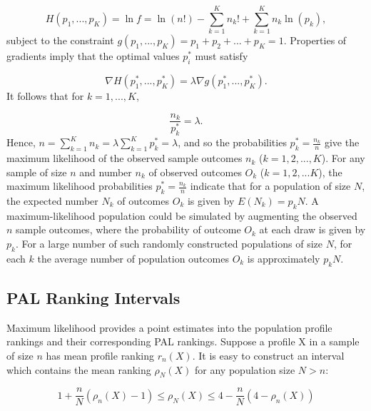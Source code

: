 \documentclass[a4paper, 12pt]{article}
\begin{document}
\begin{equation}
H(p_1, ..., p_K)=\ln f = \ln(n!) - \sum_{k=1}^{K} n_k! +\sum_{k=1}^{K} n_k\ln(p_k),
\end{equation}
\label{eq:5}
{\flushleft subject} to the constraint $g(p_1, ..., p_{K})=p_1+p_2+...+p_K=1$.  Properties of gradients imply that the optimal values $p_i^*$ must satisfy

\begin{equation}
\nabla H(p_1^*, ..., p_K^*) = \lambda \nabla g(p_1^*, ..., p_{K}^*).
\end{equation}
\label{eq:6}
{\flushleft It} follows that for $k=1, ..., K$,

\begin{equation}
\frac{n_k}{p_k^*}=\lambda.
\end{equation}
\label{eq:7}
{\flushleft Hence,} $n=\sum_{k=1}^{K} n_k =  \lambda \sum_{k=1}^{K} p_k^* = \lambda$, and so the probabilities $p_k^* = \frac{n_k}{n}$ give the maximum likelihood of the observed sample outcomes $n_k$ ($k=1, 2, ..., K$).  For any sample of size $n$ and number $n_k$ of observed outcomes $O_k$ ($k=1, 2, ...K$), the maximum likelihood probabilities $p_k^*=\frac{n_k}{n}$
indicate that for a population of size $N$, the expected number $N_k$ of outcomes $O_k$ is given by $E(N_k)=p_k N.$  A maximum-likelihood population could be simulated by augmenting the observed $n$ sample outcomes, where the probability of outcome $O_k$ at each draw is given by $p_k$.   For a large number of such randomly constructed populations of size $N$, for each $k$ the average number of population outcomes $O_k$ is approximately $p_k N$.






\subsection{PAL Ranking Intervals}

Maximum likelihood  provides a point estimates into the population profile rankings and their corresponding PAL rankings.  Suppose a profile X in a sample of size $n$ has mean profile ranking $r_n(X)$.  It is easy to construct an interval which contains the mean ranking $\rho_N(X)$ for any population size $N>n$:

\begin{equation}
1+\frac{n}{N}(\rho_n(X)-1)\le \rho_N(X)  \le 4-\frac{n}{N}(4-\rho_n(X))
\label{eq6}
\end{equation}
\end{document}
